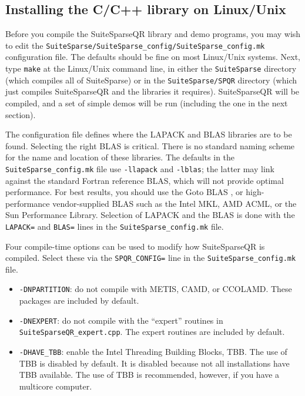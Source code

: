 \documentclass[12pt]{article}
\begin{document}
\subsection{Installing the C/C++ library on Linux/Unix}

Before you compile the SuiteSparseQR library and demo programs, you may wish to
edit the \verb'SuiteSparse/SuiteSparse_config/SuiteSparse_config.mk' configuration file.  The
defaults should be fine on most Linux/Unix systems.  Next, type \verb'make' at
the Linux/Unix command line, in either the \verb'SuiteSparse' directory (which
compiles all of SuiteSparse) or in the \verb'SuiteSparse/SPQR' directory (which
just compiles SuiteSparseQR and the libraries it requires).  SuiteSparseQR will
be compiled, and a set of simple demos will be run (including the one in the
next section).

The configuration file defines where the LAPACK and BLAS libraries are to be
found.  Selecting the right BLAS is critical.  There is no standard naming
scheme for the name and location of these libraries.  The defaults in the
\verb'SuiteSparse_config.mk' file use \verb'-llapack' and \verb'-lblas'; the latter may
link against the standard Fortran reference BLAS, which will not provide
optimal performance.  For best results, you should use the Goto BLAS
\cite{GotoVanDeGeijn08}, or high-performance vendor-supplied BLAS such as the
Intel MKL, AMD ACML, or the Sun Performance Library.  Selection of LAPACK and
the BLAS is done with the \verb'LAPACK=' and \verb'BLAS=' lines in the
\verb'SuiteSparse_config.mk' file.

Four compile-time options can be used to modify how SuiteSparseQR is compiled.
Select these via the \verb'SPQR_CONFIG=' line in the \verb'SuiteSparse_config.mk' file.

\begin{itemize}

    \item \verb'-DNPARTITION': do not compile with METIS, CAMD, or CCOLAMD.
    These packages are included by default.

    \item \verb'-DNEXPERT': do not compile with the ``expert'' routines in
    \verb'SuiteSparseQR_expert.cpp'.  The expert routines are included by
    default.

    \item \verb'-DHAVE_TBB': enable the Intel Threading Building Blocks, TBB.
    The use of TBB is disabled by default.  It is disabled because not all
    installations have TBB available.  The use of TBB is recommended, however,
    if you have a multicore computer.

\end{itemize}
\end{document}
